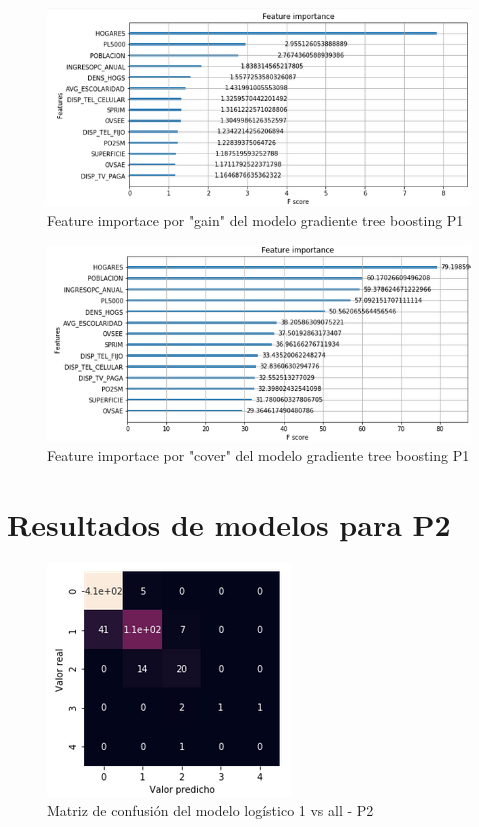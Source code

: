\documentclass[9pt,twocolumn,twoside]{ilcss}
\begin{document}
\begin{appendices}
\begin{figure}[tbhp]
	\centering
	\includegraphics[width=1\linewidth]{images/p1_xgboost_gain.png}
	\caption{Feature importace por "gain" del modelo gradiente tree boosting P1}
	\label{fig:p1_xgboost_gain}
\end{figure}

\begin{figure}[tbhp]
	\centering
	\includegraphics[width=1\linewidth]{images/p1_xgboost_cover.png}\newpage
	\caption{Feature importace por "cover" del modelo gradiente tree boosting P1}
		\label{fig:p1_xgboost_cover}
\end{figure}
	
\section{Resultados de modelos para P2}

\begin{figure}[tbhp]
	\centering
	\includegraphics[width=0.6\linewidth]{images/p2_mc_logistic_1toall.png}
	\caption{Matriz de confusión del modelo logístico 1 vs all - P2 }
	\label{fig:p2_mc_logistic_1toall}
\end{figure}


\end{appendices}
\end{document}
